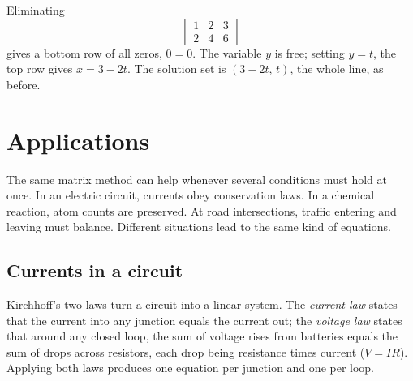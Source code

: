 \documentclass[12pt]{book}
\begin{document}
\begin{example}
Eliminating
\[
\left[\begin{array}{cc|c}
1&2&3\\ 2&4&6
\end{array}\right]
\]
gives a bottom row of all zeros, $0=0$. The variable $y$ is free; setting $y=t$, the
top row gives $x=3-2t$. The solution set is $(3-2t,\,t)$, the whole line, as before.
\end{example}

\section{Applications}

The same matrix method can help whenever several conditions
must hold at once. In an electric circuit, currents obey
conservation laws. In a chemical reaction, atom counts are
preserved. At road intersections, traffic entering and leaving
must balance. Different situations lead to the same kind
of equations.

\subsection{Currents in a circuit}

Kirchhoff's two laws turn a circuit into a linear system. The \emph{current law}
states that the current into any junction equals the current out; the \emph{voltage
law} states that around any closed loop, the sum of voltage rises from batteries
equals the sum of drops across resistors, each drop being resistance times current
($V=IR$). Applying both laws produces one equation per junction and one per loop.

\begin{center}
\end{center}
\end{document}
